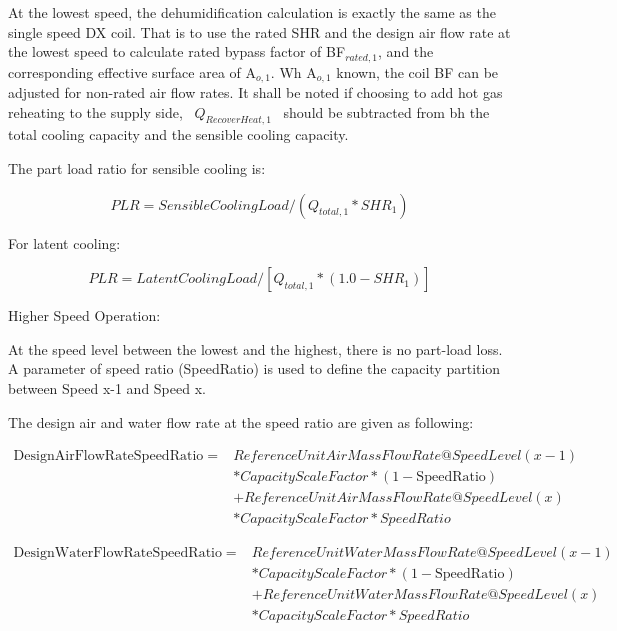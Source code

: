 At the lowest speed, the dehumidification calculation is exactly the same as the single speed DX coil. That is to use the rated SHR and the design air flow rate at the lowest speed to calculate rated bypass factor of BF\(_{rated,1}\), and the corresponding effective surface area of A\(_{o,1}\). Wh A\(_{o,1}\) known, the coil BF can be adjusted for non-rated air flow rates. It shall be noted if choosing to add hot gas reheating to the supply side,~ \({Q_{RecoverHeat,1}}\) ~should be subtracted from bh the total cooling capacity and the sensible cooling capacity.

The part load ratio for sensible cooling is:

\begin{equation}
PLR = SensibleCoolingLoad/({Q_{total,1}}*SH{R_1})
\end{equation}

For latent cooling:

\begin{equation}
PLR = LatentCoolingLoad/[{Q_{total,1}}*(1.0 - SH{R_1})]
\end{equation}

Higher Speed Operation:

At the speed level between the lowest and the highest, there is no part-load loss. A parameter of speed ratio (SpeedRatio) is used to define the capacity partition between Speed x-1 and Speed x.

The design air and water flow rate at the speed ratio are given as following:

\begin{equation}
  \begin{array}{rl}
    {\mathrm{DesignAirFlowRateSpeedRatio}} =& ReferenceUnitAirMassFlowRate@SpeedLevel\left( {x - 1} \right) \\
                                       &* CapacityScaleFactor * \left( {1-\mathrm{SpeedRatio}} \right) \\
                                       &+ ReferenceUnitAirMassFlowRate@SpeedLevel\left( x \right) \\
                                       &* CapacityScaleFactor * SpeedRatio
  \end{array}
\end{equation}

\begin{equation}
  \begin{array}{rl}
    \mathrm{DesignWaterFlowRateSpeedRatio} =& ReferenceUnitWaterMassFlowRate@SpeedLevel\left( {x - 1} \right) \\
                                        &* CapacityScaleFactor * \left( {1-\mathrm{SpeedRatio}} \right) \\
                                        &+ ReferenceUnitWaterMassFlowRate@SpeedLevel\left( x \right) \\
                                        &* CapacityScaleFactor * SpeedRatio
  \end{array}
\end{equation}

